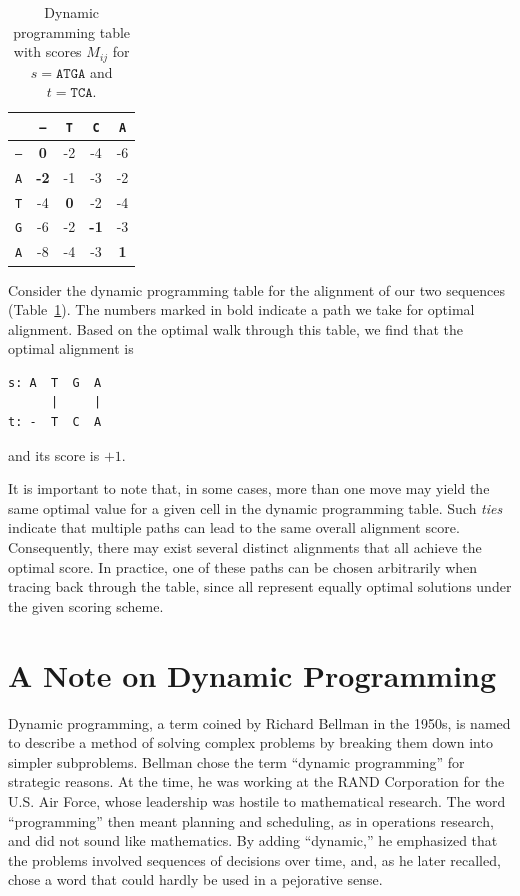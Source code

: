 \begin{table}[h!]
\centering
\caption{Dynamic programming table with scores $M_{ij}$ for $s=\texttt{ATGA}$ and $t=\texttt{TCA}$.}
\label{t:dpt}
\begin{tabular}{c|cccc}
\hline
 & \texttt{–} & \texttt{T} & \texttt{C} & \texttt{A} \\
\hline
\texttt{–} & \textbf{0}  & -2 & -4 & -6 \\
\texttt{A} & \textbf{-2} & -1 & -3 & -2 \\
\texttt{T} & -4 & \textbf{0} & -2 & -4 \\
\texttt{G} & -6 & -2 & \textbf{-1} & -3 \\
\texttt{A} & -8 & -4 & -3 & \textbf{1} \\
\hline
\end{tabular}
\end{table}

Consider the dynamic programming table for the alignment of our two sequences (Table~\ref{t:dpt}). The numbers marked in bold indicate a path we take for optimal alignment. Based on the optimal walk through this table, we find that the optimal alignment is
\begin{verbatim}
s: A  T  G  A
      |     |
t: -  T  C  A
\end{verbatim}
and its score is $+1$.

It is important to note that, in some cases, more than one move may yield the same optimal value for a given cell in the dynamic programming table. Such \emph{ties} indicate that multiple paths can lead to the same overall alignment score. Consequently, there may exist several distinct alignments that all achieve the optimal score. In practice, one of these paths can be chosen arbitrarily when tracing back through the table, since all represent equally optimal solutions under the given scoring scheme.

\section{A Note on Dynamic Programming}

Dynamic programming, a term coined by Richard Bellman in the 1950s,
 is named to describe a method of solving complex problems by breaking them down into simpler subproblems. Bellman chose the term ``dynamic programming'' for strategic reasons. At the time, he was working at the RAND Corporation for the U.S. Air Force, whose leadership was hostile to mathematical research. The word ``programming'' then meant planning and scheduling, as in operations research, and did not sound like mathematics. By adding ``dynamic,'' he emphasized that the problems involved sequences of decisions over time, and, as he later recalled, chose a word that could hardly be used in a pejorative sense.

